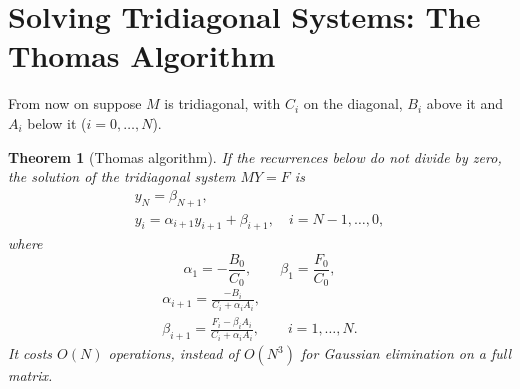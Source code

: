 \documentclass[11pt,a4paper]{article}
\numberwithin{equation}{section}
\theoremstyle{spacedplain}
\newtheorem{theorem}{Theorem}[section]
\theoremstyle{spaceddefinition}
\theoremstyle{spacedremark}
\begin{document}
\section{Solving Tridiagonal Systems: The Thomas Algorithm}

From now on suppose \(M\) is tridiagonal, with \(C_i\) on the diagonal,
\(B_i\) above it and \(A_i\) below it (\(i=0,\dots,N\)).

\begin{keybox}
\begin{theorem}[Thomas algorithm]\label{thm:thomas}
If the recurrences below do not divide by zero, the solution of the
tridiagonal system \(MY=F\) is
\[
\begin{gathered}
  y_N=\beta_{N+1},
  \\
  y_i=\alpha_{i+1}y_{i+1}+\beta_{i+1},\quad i=N-1,\dots,0,
\end{gathered}
\]
where
\[
  \alpha_1=-\frac{B_0}{C_0},\qquad \beta_1=\frac{F_0}{C_0},
\]
\[
\begin{gathered}
  \alpha_{i+1}=\frac{-B_i}{C_i+\alpha_iA_i},
  \\
  \beta_{i+1}=\frac{F_i-\beta_iA_i}{C_i+\alpha_iA_i},
  \qquad i=1,\dots,N.
\end{gathered}
\]
It costs \(O(N)\) operations, instead of \(O(N^3)\) for Gaussian
elimination on a full matrix.
\end{theorem}
\end{keybox}
\end{document}
